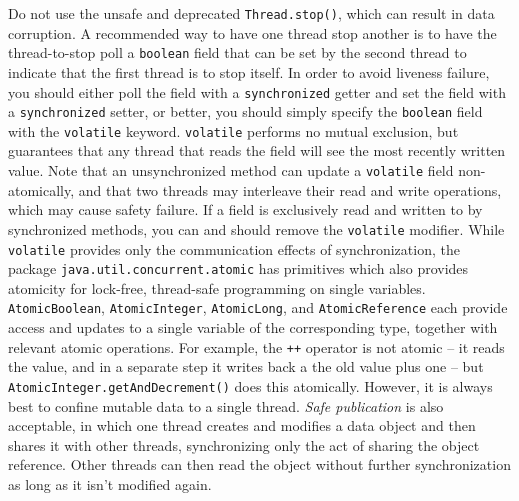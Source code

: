 \documentclass[table, xcdraw]{article}%
\begin{document}
Do not use the unsafe and deprecated \texttt{Thread.stop()}, which can result in data corruption. A recommended way to have one thread stop another is to have the thread-to-stop poll a \texttt{boolean} field that can be set by the second thread to indicate that the first thread is to stop itself. In order to avoid liveness failure, you should either poll the field with a \texttt{synchronized} getter and set the field with a \texttt{synchronized} setter, or better, you should simply specify the \texttt{boolean} field with the \texttt{volatile} keyword. \texttt{volatile} performs no mutual exclusion, but guarantees that any thread that reads the field will see the most recently written value. Note that an unsynchronized method can update a \texttt{volatile} field non-atomically, and that two threads may interleave their read and write operations, which may cause safety failure. If a field is exclusively read and written to by synchronized methods, you can and should remove the \texttt{volatile} modifier. While \texttt{volatile} provides only the communication effects of synchronization, the package \texttt{java.util.concurrent.atomic} has primitives which also provides atomicity for lock-free, thread-safe programming on single variables. \texttt{AtomicBoolean}, \texttt{AtomicInteger}, \texttt{AtomicLong}, and \texttt{AtomicReference} each provide access and updates to a single variable of the corresponding type, together with relevant atomic operations. For example, the \texttt{++} operator is not atomic -- it reads the value, and in a separate step it writes back a the old value plus one -- but \texttt{AtomicInteger.getAndDecrement()} does this atomically. However, it is always best to confine mutable data to a single thread. \emph{Safe publication} is also acceptable, in which one thread creates and modifies a data object and then shares it with other threads, synchronizing only the act of sharing the object reference. Other threads can then read the object without further synchronization as long as it isn't modified again.
\end{document}
